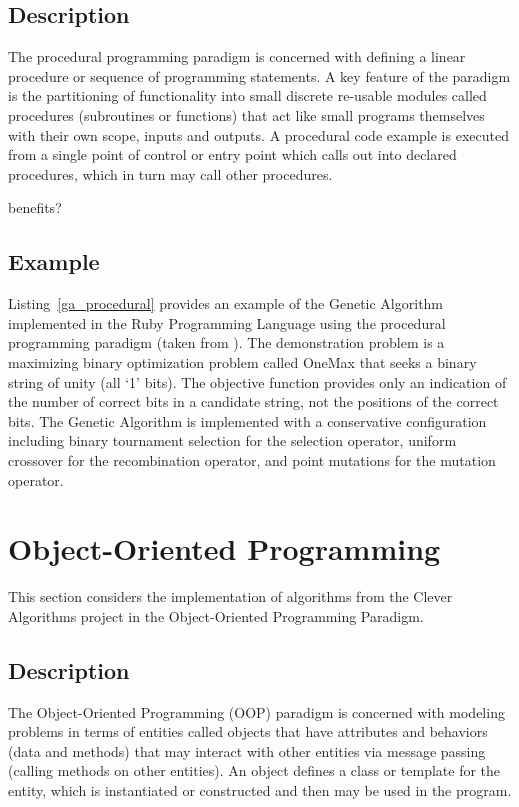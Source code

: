 \documentclass[a4paper, 11pt]{article}
\begin{document}
\subsection{Description}
The procedural programming paradigm is concerned with defining a linear procedure or sequence of programming statements. A key feature of the paradigm is the partitioning of functionality into small discrete re-usable modules called procedures (subroutines or functions) that act like small programs themselves with their own scope, inputs and outputs. A procedural code example is executed from a single point of control or entry point which calls out into declared procedures, which in turn may call other procedures.

benefits?

\subsection{Example}
Listing~\ref{ga_procedural} provides an example of the Genetic Algorithm implemented in the Ruby Programming Language using the procedural programming paradigm (taken from \cite{Brownlee2010p}).  
The demonstration problem is a maximizing binary optimization problem called OneMax that seeks a binary string of unity (all `1' bits). The objective function provides only an indication of the number of correct bits in a candidate string, not the positions of the correct bits.
The Genetic Algorithm is implemented with a conservative configuration including binary tournament selection for the selection operator, uniform crossover for the recombination operator, and point mutations for the mutation operator.



\section{Object-Oriented Programming}
This section considers the implementation of algorithms from the Clever Algorithms project in the Object-Oriented Programming Paradigm.

\subsection{Description}
The Object-Oriented Programming (OOP) paradigm is concerned with modeling problems in terms of entities called objects that have attributes and behaviors (data and methods) that may interact with other entities via message passing (calling methods on other entities). An object defines a class or template for the entity, which is instantiated or constructed and then may be used in the program.
\end{document}
